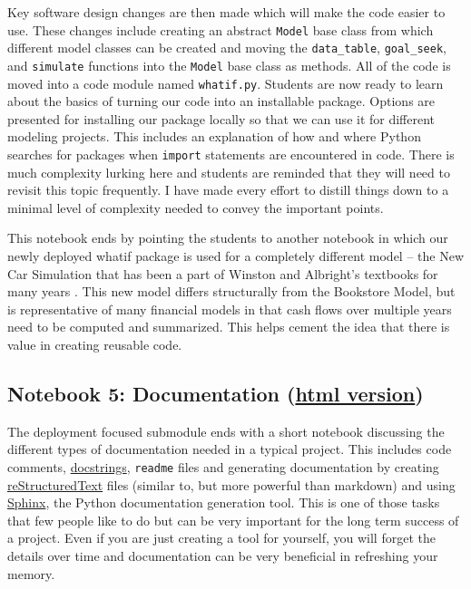 \documentclass[ited]{informs3}                      %
\newcommand{\code}[1]{\texttt{#1}}
\begin{document}
Key software design changes are then made which will make the code easier to use. These changes include creating an abstract \code{Model} base class from which different model classes can be created and moving the \code{data\_table}, \code{goal\_seek}, and \code{simulate} functions into the \code{Model} base class as methods. All of the code is moved into a code module named \code{whatif.py}. Students are now ready to learn about the basics of turning our code into an installable package. Options are presented for installing our package locally so that we can use it for different modeling projects. This includes an explanation of how and where Python searches for packages when \code{import} statements are encountered in code. There is much complexity lurking here and students are reminded that they will need to revisit this topic frequently. I have made every effort to distill things down to a minimal level of complexity needed to convey the important points.

This notebook ends by pointing the students to another notebook in which our newly deployed whatif package is used for a completely different model -- the New Car Simulation that has been a part of Winston and Albright's textbooks for many years \citep{winstonPracticalManagementScience2018,albrightBusinessAnalyticsData2016}. This new model differs structurally from the Bookstore Model, but is representative of many financial models in that cash flows over multiple years need to be computed and summarized. This helps cement the idea that there is value in creating reusable code.

\subsection{Notebook 5: Documentation (\href{http://www.sba.oakland.edu/faculty/isken/excel_with_python/what_if_5_documentation.html}{html version})}

The deployment focused submodule ends with a short notebook discussing the different types of documentation needed in a typical project. This includes code comments, \href{https://peps.python.org/pep-0257/}{docstrings}, \code{readme} files and generating documentation by creating \href{https://www.sphinx-doc.org/en/master/usage/restructuredtext/basics.html}{reStructuredText} files (similar to, but more powerful than markdown) and using \href{https://www.sphinx-doc.org/en/master/index.html}{Sphinx}, the Python documentation generation tool. This is one of those tasks that few people like to do but can be very important for the long term success of a project. Even if you are just creating a tool for yourself, you will forget the details over time and documentation can be very beneficial in refreshing your memory. 
\end{document}
